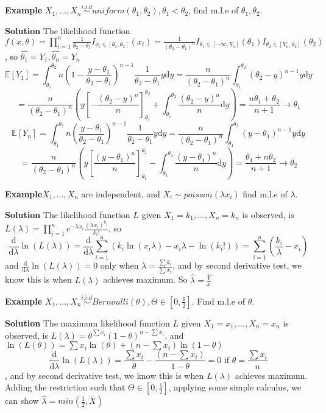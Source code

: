 \documentclass[a4paper,12pt]{article}
\begin{document}
\textbf{Example}  $X_1, ..., X_n \overset{i.i.d}{\sim} uniform(\theta_1, \theta_2), \theta_1 < \theta_2$, find m.l.e of $\theta_1, \theta_2$. 

\textbf{Solution} The likelihood function $f(x, \theta) = \prod_{i=1}^n \frac{1}{\theta_2 - \theta_1}I_{x_i\in[\theta_1, \theta_2]}(x_i) = \frac{1}{(\theta_2 - \theta_1)^n}I_{\theta_1\in[-\infty, Y_1]}(\theta_1)I_{\theta_2\in[Y_n, \theta_2]}(\theta_2) $, so $\hat{\theta_1} = Y_1, \hat{\theta_n} = Y_n$ 
$$\mathbb{E}[Y_1] = \int_{\theta_1}^{\theta_2} n(1-\frac{y-\theta_1}{\theta_2-\theta_1})^{n-1}\frac{1}{\theta_2-\theta_1}y \mathrm{d}y = \frac{n}{(\theta_2-\theta_1)^n}\int_{\theta_1}^{\theta_2} (\theta_2-y)^{n-1}y\mathrm{d}y$$
$$= \frac{n}{(\theta_2-\theta_1)^n}( y[-\frac{(\theta_2-y)^n}{n}]_{\theta_1}^{\theta_2} + \int_{\theta_1}^{\theta_2}\frac{(\theta_2-y)^n}{n}\mathrm{d}y) = \frac{n\theta_1+\theta_2}{n+1}\to\theta_1$$
$$\mathbb{E}[Y_n] = \int_{\theta_1}^{\theta_2} n(\frac{y-\theta_1}{\theta_2-\theta_1})^{n-1}\frac{1}{\theta_2-\theta_1}y \mathrm{d}y = \frac{n}{(\theta_2-\theta_1)^n}\int_{\theta_1}^{\theta_2} (y-\theta_1)^{n-1}y\mathrm{d}y$$
$$= \frac{n}{(\theta_2-\theta_1)^n}( y[\frac{(y-\theta_1)^n}{n}]_{\theta_1}^{\theta_2} - \int_{\theta_1}^{\theta_2}\frac{(y-\theta_1)^n}{n}\mathrm{d}y) = \frac{\theta_1+n\theta_2}{n+1}\to\theta_2$$

\textbf{Example}$X_1, ..., X_n  $ are independent, and $X_i\sim poisson(\lambda x_i)$ find m.l.e of $\lambda$. 

\textbf{Solution} The likelihood function $L$ given $X_1 = k_1, ..., X_n = k_n$ is observed, is $L(\lambda) = \prod_{i=1}^n e^{-\lambda x_i}\frac{(\lambda x_i)^{k_i}}{k_i!}$, so 
$$\frac{\mathrm{d}}{\mathrm{d}\lambda}\ln(L(\lambda)) = \frac{\mathrm{d}}{\mathrm{d}\lambda}\sum_{i=1}^n (k_i\ln(x_i\lambda)-x_i\lambda-\ln(k_i!)) = \sum_{i=1}^n(\frac{k_i}{\lambda}-x_i)$$ and $\frac{\mathrm{d}}{\mathrm{d}\lambda}\ln(L(\lambda)) = 0$ only when $\lambda = \frac{\sum k_i}{\sum x_i}$, and by second derivative test, we know this is when $L(\lambda)$ achieves maximum. So $\hat{\lambda} = \frac{\bar{Y}}{\bar{x}}$ 

\textbf{Example} $X_1, ..., X_n \overset{i.i.d}{\sim} Bernoulli(\theta), \Theta \in [0, \frac{1}{2}]$. Find m.l.e of $\theta$. 

\textbf{Solution} The maximum likelihood function $L$ given $X_1 = x_1, ..., X_n = x_n$ is observed, is $L(\lambda) = \theta^{\sum x_i} (1-\theta)^{n-\sum x_i}$, and $\ln(L(\theta)) = \sum x_i \ln(\theta) + (n-\sum x_i)\ln(1-\theta)$
$$\frac{\mathrm{d}}{\mathrm{d}\lambda}\ln(L(\lambda)) = \frac{\sum x_i}{\theta} - \frac{(n-\sum x_i)}{1-\theta} = 0 \text{ if } \theta = \frac{\sum x_i}{n}$$
, and by second derivative test, we know this is when $L(\lambda)$ achieves maximum. Adding the restriction such that $\Theta \in [0, \frac{1}{2}]$, applying some simple calculus, we can show $\hat{\lambda} = min( \frac{1}{2}, \bar{X} )$
 
\end{document}
